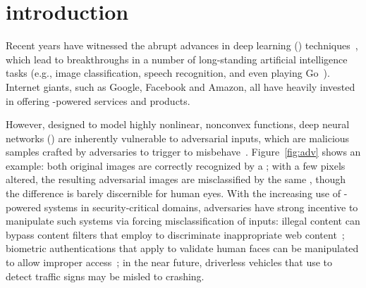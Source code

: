 \section{introduction}
\label{sec:introduction}


Recent years have witnessed the abrupt advances in deep learning (\dl) techniques~\cite{LeCun:2015:nature}, which lead to breakthroughs in a number of long-standing artificial intelligence tasks (e.g., image classification, speech recognition, and even playing Go~\cite{go}). Internet giants, such as Google, Facebook and Amazon, all have heavily invested in offering \dl-powered services and products.
%



However, designed to model highly nonlinear, nonconvex functions, deep neural networks (\dnns) are inherently vulnerable to adversarial inputs, which are malicious samples crafted by adversaries to trigger \dnns to misbehave~\cite{Szegedy:2013:arxiv}. Figure~\ref{fig:adv} shows an example: both original images are correctly recognized by a \dnn; with a few pixels altered, the resulting adversarial images are misclassified by the same \dnn, though the difference is barely discernible for human eyes. With the increasing use of \dl-powered systems in security-critical domains, adversaries have strong incentive to manipulate such systems via forcing misclassification of inputs: illegal content can bypass content filters that employ \dl to discriminate inappropriate web
content~\cite{Grosse:arxiv:2016}; biometric authentications that apply \dl to validate human faces can be manipulated to allow improper access~\cite{Sharif:2016:ccs}; in the near future, driverless vehicles that use \dl to detect traffic signs may be misled to crashing.



